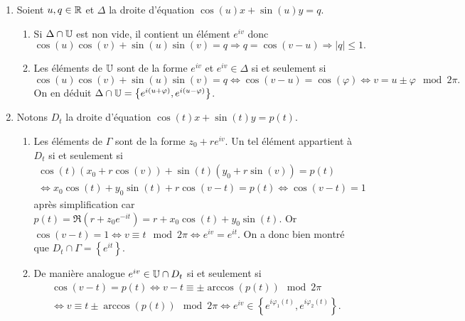 \begin{enumerate}
\item Soient $u, q\in \mathbb{R}$ et $\Delta$ la droite d'équation $\cos(u)x + \sin(u)y = q$.
\begin{enumerate}
  \item Si $\Delta \cap \mathbb{U}$ est non vide, il contient un élément $e^{iv}$ donc 
\[
  \cos(u) \cos(v)+\sin(u)\sin(v) = q \Rightarrow q = \cos(v-u) \Rightarrow |q| \leq 1. 
\]
  \item Les éléments de $\mathbb{U}$ sont de la forme $e^{iv}$ et $e^{iv} \in \Delta$ si et seulement si
\[
\cos(u) \cos(v)+\sin(u)\sin(v) = q \Leftrightarrow \cos(v-u) = \cos(\varphi) \Leftrightarrow v = u \pm \varphi \mod 2\pi.  
\]
On en déduit $\Delta \cap \mathbb{U} = \left\lbrace e^{i(u + \varphi)}, e^{i(u - \varphi)}\right\rbrace$.
\end{enumerate}

\item Notons $D_{t}$ la droite d'équation $\cos(t)x + \sin(t)y = p(t)$.
\begin{enumerate}
  \item Les éléments de $\Gamma$ sont de la forme $z_0 + r e^{iv}$. Un tel élément appartient à $D_t$ si et seulement si
\begin{multline*}
  \cos(t)(x_0 + r\cos(v)) + \sin(t)(y_0 + r \sin(v)) = p(t) \\
  \Leftrightarrow
  x_0 \cos(t) + y_0\sin(t) + r\cos(v-t) = p(t) \Leftrightarrow \cos(v-t) = 1
\end{multline*}
après simplification car $p(t) = \Re(r + z_0 e^{-it}) = r + x_0 \cos(t) + y_0\sin(t)$.\newline
Or $\cos(v-t) = 1 \Leftrightarrow v \equiv t \mod 2\pi \Leftrightarrow e^{iv} = e^{it}$.\newline
On a donc bien montré que 
$D_t \cap \Gamma = \left\lbrace e^{it}\right\rbrace$.
  \item De manière analogue $e^{iv} \in \mathbb{U} \cap D_t$ si et seulement si
\begin{multline*}
  \cos(v-t) = p(t) \Leftrightarrow v - t \equiv \pm \arccos(p(t)) \mod 2\pi \\
  \Leftrightarrow v \equiv t \pm \arccos(p(t)) \mod 2\pi
  \Leftrightarrow e^{iv} \in \left\lbrace e^{i\varphi_1(t)}, e^{i\varphi_2(t)}\right\rbrace.
\end{multline*}
\end{enumerate}


\end{enumerate}
